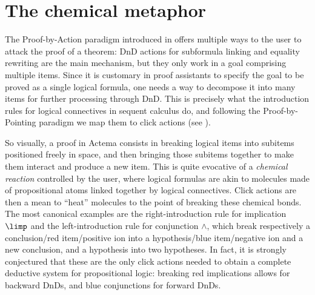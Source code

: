 \section{The chemical metaphor}

The Proof-by-Action paradigm introduced in  offers multiple ways to
the user to attack the proof of a theorem: DnD actions for subformula linking
and equality rewriting are the main mechanism, but they only work in a goal
comprising multiple items. Since it is customary in proof assistants to specify
the goal to be proved as a single logical formula, one needs a way to decompose
it into many items for further processing through DnD. This is precisely what
the introduction rules for logical connectives in sequent calculus do, and
following the Proof-by-Pointing paradigm \cite{PbP} we map them to click
actions (see ).

So visually, a proof in Actema consists in breaking logical items into subitems
positioned freely in space, and then bringing those subitems together to make
them interact and produce a new item. This is quite evocative of a
\emph{chemical reaction} controlled by the user, where logical formulas are akin
to molecules made of propositional atoms linked together by logical
connectives. Click actions are then a mean to ``heat'' molecules to the point of
breaking these chemical bonds. The most canonical examples are the
right-introduction rule for implication $\limp$ and the left-introduction rule
for conjunction $\land$, which break respectively a conclusion/red item/positive
ion into a hypothesis/blue item/negative ion and a new conclusion, and a
hypothesis into two hypotheses. In fact, it is strongly conjectured that these
are the only click actions needed to obtain a complete deductive system for
propositional logic: breaking red implications allows for backward DnDs, and
blue conjunctions for forward DnDs.

